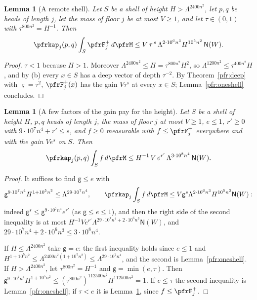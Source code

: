 \documentclass[10pt]{amsart}
\newtheorem{lemma}[theorem]{Lemma}
\theoremstyle{definition}
\theoremstyle{remark}
\begin{document}
\begin{lemma}[A remote shell]\label{pfr:remoteshell}
Let $S$ be a shell of height $H>\Lambda^{2400n^2}$, let $p,q$ be heads of length $j$, let the mass of
floor $j$ be at most $V\ge1$, and let $\tau\in(0,1)$ with $\tau^{800n^2}=H^{-1}$. Then
\[
\pfrkap_j(p,q)\int_S\pfrF^+_j\,d\pfrM\le V\,\tau^{\,s}\,\Lambda^{2\cdot10^6n^3}H^{10^5n^2}\,\mathsf N(W).
\]
\end{lemma}
\begin{proof}
$\tau<1$ because $H>1$. Moreover $\Lambda^{2400n^2}\le H=\tau^{800n^2}H^2$, so
$\Lambda^{1200n^2}\le\tau^{400n^2}H$, and by (b) every $x\in S$ has a deep vector of depth $\tau^{-2}$.
By Theorem~\ref{pfr:deep} with $\varsigma=\tau^2$, $\pfrF^+_j(x)$ has the gain $V\tau^{s}$ at every
$x\in S$; Lemma~\ref{pfr:oneshell} concludes.
\end{proof}

\begin{lemma}[A few factors of the gain pay for the height]\label{pfr:payheight}
Let $S$ be a shell of height $H$, $p,q$ heads of length $j$, the mass of floor $j$ at most $V\ge1$,
$e\le1$, $r'\ge0$ with $9\cdot10^7n^4+r'\le s$, and $f\ge0$ measurable with $f\le\pfrF_j^+$ everywhere
and with the gain $Ve^{s}$ on $S$. Then
\[
\pfrkap_j(p,q)\int_Sf\,d\pfrM\le H^{-1}\,V\,e^{r'}\,\Lambda^{3\cdot10^8n^4}\,\mathsf N(W).
\]
\end{lemma}
\begin{proof}
It suffices to find $\mathsf g\le e$ with
\begin{equation}\label{pfr:eq-pay}
\mathsf g^{9\cdot10^7n^4}H^{1+10^5n^2}\le\Lambda^{29\cdot10^7n^4},\qquad
\pfrkap_j\int_Sf\,d\pfrM\le V\mathsf g^{s}\Lambda^{2\cdot10^6n^3}H^{10^5n^2}\mathsf N(W):
\end{equation}
indeed $\mathsf g^s\le\mathsf g^{9\cdot10^7n^4}e^{r'}$ (as $\mathsf g\le e\le1$), and then the right side
of the second inequality is at most $H^{-1}Ve^{r'}\Lambda^{29\cdot10^7n^4+2\cdot10^6n^3}\mathsf N(W)$, and
$29\cdot10^7n^4+2\cdot10^6n^3\le3\cdot10^8n^4$.

If $H\le\Lambda^{2400n^2}$ take $\mathsf g=e$: the first inequality holds since $e\le1$ and
$H^{1+10^5n^2}\le\Lambda^{2400n^2(1+10^5n^2)}\le\Lambda^{29\cdot10^7n^4}$, and the second is
Lemma~\ref{pfr:oneshell}. If $H>\Lambda^{2400n^2}$, let $\tau^{800n^2}=H^{-1}$ and
$\mathsf g=\min(e,\tau)$. Then $\mathsf g^{9\cdot10^7n^4}H^{1+10^5n^2}\le(\tau^{800n^2})^{112500n^2}
H^{112500n^2}=1$. If $e\le\tau$ the second inequality is Lemma~\ref{pfr:oneshell}; if $\tau<e$ it is
Lemma~\ref{pfr:remoteshell}, since $f\le\pfrF^+_j$.
\end{proof}
\end{document}
